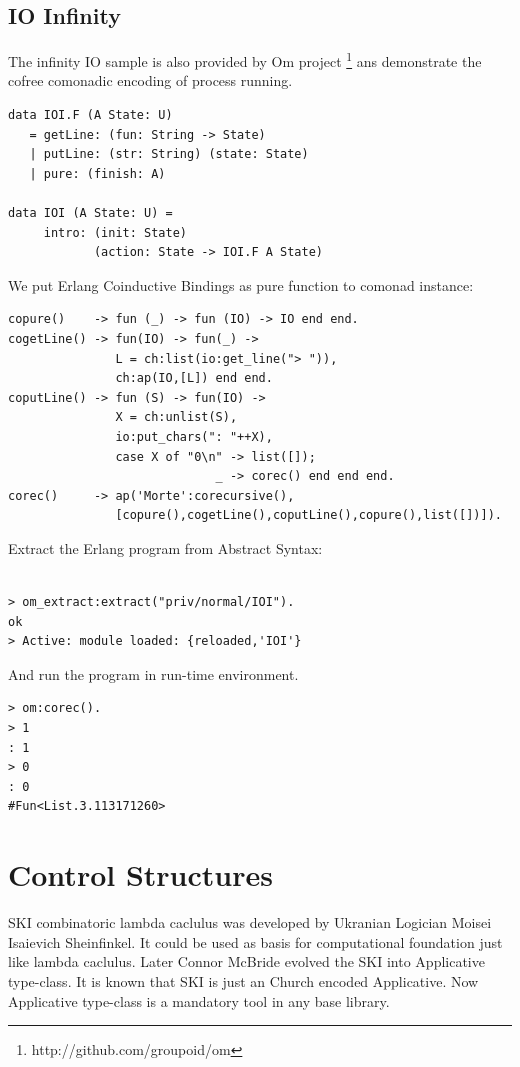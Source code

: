 \documentclass{article}
\begin{document}
\subsection*{IO Infinity}

The infinity IO sample is also provided by Om project \footnote{http://github.com/groupoid/om}
ans demonstrate the cofree comonadic encoding of process running.

\begin{lstlisting}[mathescape=true]
data IOI.F (A State: U)
   = getLine: (fun: String -> State)
   | putLine: (str: String) (state: State)
   | pure: (finish: A)

data IOI (A State: U) =
     intro: (init: State)
            (action: State -> IOI.F A State)
\end{lstlisting}

We put Erlang Coinductive Bindings as pure function to comonad instance:

\begin{lstlisting}[mathescape=true]
copure()    -> fun (_) -> fun (IO) -> IO end end.
cogetLine() -> fun(IO) -> fun(_) ->
               L = ch:list(io:get_line("> ")),
               ch:ap(IO,[L]) end end.
coputLine() -> fun (S) -> fun(IO) ->
               X = ch:unlist(S),
               io:put_chars(": "++X),
               case X of "0\n" -> list([]);
                             _ -> corec() end end end.
corec()     -> ap('Morte':corecursive(),
               [copure(),cogetLine(),coputLine(),copure(),list([])]).
\end{lstlisting}

Extract the Erlang program from Abstract Syntax:

\begin{lstlisting}[mathescape=true]

> om_extract:extract("priv/normal/IOI").
ok
> Active: module loaded: {reloaded,'IOI'}
\end{lstlisting}

And run the program in run-time environment.

\begin{lstlisting}[mathescape=true]
> om:corec().
> 1
: 1
> 0
: 0
#Fun<List.3.113171260>
\end{lstlisting}

\newpage
\section{Control Structures}

SKI combinatoric lambda caclulus was developed by Ukranian Logician
Moisei Isaievich Sheinfinkel. It could be used as basis for computational
foundation just like lambda caclulus. Later Connor McBride evolved the SKI
into Applicative type-class. It is known that SKI is just an Church encoded Applicative.
Now Applicative type-class is a mandatory tool in any base library.
\end{document}
